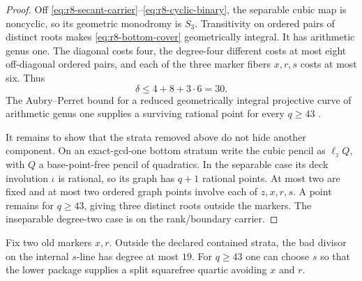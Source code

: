 \begin{proof}
Off \eqref{eq:r8-secant-carrier}--\eqref{eq:r8-cyclic-binary}, the
separable cubic map is noncyclic, so its geometric
monodromy is $S_3$.  Transitivity on ordered pairs of distinct roots
makes \eqref{eq:r8-bottom-cover} geometrically integral.  It has
arithmetic genus one.
The diagonal costs four, the degree-four different costs at most
eight off-diagonal ordered pairs, and each of the three marker fibers
$x,r,s$ costs at most six.  Thus
\begin{equation}\label{eq:r8-deletion}
 \delta\leq4+8+3\cdot6=30.
\end{equation}
The Aubry--Perret bound for a reduced geometrically integral projective
curve of arithmetic genus one supplies a surviving rational point for
every $q\geq43$ \cite[p.~468]{AubryPerret1995}.

It remains to show that the strata removed above do not hide another
component.  On an exact-gcd-one bottom stratum write the cubic pencil
as $\ell_zQ$, with $Q$ a base-point-free pencil of quadratics.  In the
separable case its deck involution $\iota$ is rational, so its graph
has $q+1$ rational points.  At most two are fixed and at most two
ordered graph points involve each of $z,x,r,s$.  A point remains for
$q\geq43$, giving three distinct roots outside the markers.  The
inseparable degree-two case is on the rank/boundary carrier.
\end{proof}

\begin{lemma}\label{lem:r8-two-marker}%
%
Fix two old markers $x,r$.  Outside the declared contained strata,
the bad divisor on the internal $s$-line has degree at most $19$.
For $q\geq43$ one can choose $s$ so that the lower package supplies a
split squarefree quartic avoiding $x$ and $r$.
\end{lemma}

